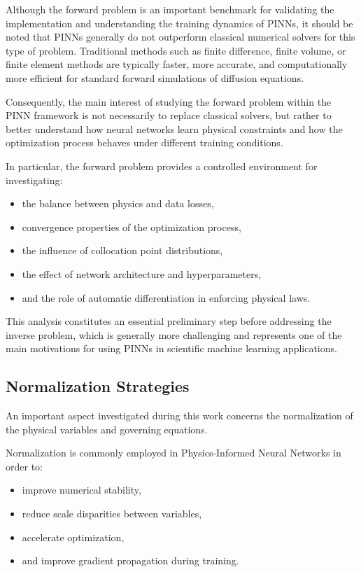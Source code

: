 Although the forward problem is an important benchmark for validating the implementation and understanding the training dynamics of PINNs, it should be noted that PINNs generally do not outperform classical numerical solvers for this type of problem. Traditional methods such as finite difference, finite volume, or finite element methods are typically faster, more accurate, and computationally more efficient for standard forward simulations of diffusion equations.

Consequently, the main interest of studying the forward problem within the PINN framework is not necessarily to replace classical solvers, but rather to better understand how neural networks learn physical constraints and how the optimization process behaves under different training conditions.

In particular, the forward problem provides a controlled environment for investigating:
\begin{itemize}
    \item the balance between physics and data losses,
    \item convergence properties of the optimization process,
    \item the influence of collocation point distributions,
    \item the effect of network architecture and hyperparameters,
    \item and the role of automatic differentiation in enforcing physical laws.
\end{itemize}

This analysis constitutes an essential preliminary step before addressing the inverse problem, which is generally more challenging and represents one of the main motivations for using PINNs in scientific machine learning applications.

\subsection{Normalization Strategies}

An important aspect investigated during this work concerns the normalization of the physical variables and governing equations.

Normalization is commonly employed in Physics-Informed Neural Networks in order to:
\begin{itemize}
    \item improve numerical stability,
    \item reduce scale disparities between variables,
    \item accelerate optimization,
    \item and improve gradient propagation during training.
\end{itemize}

